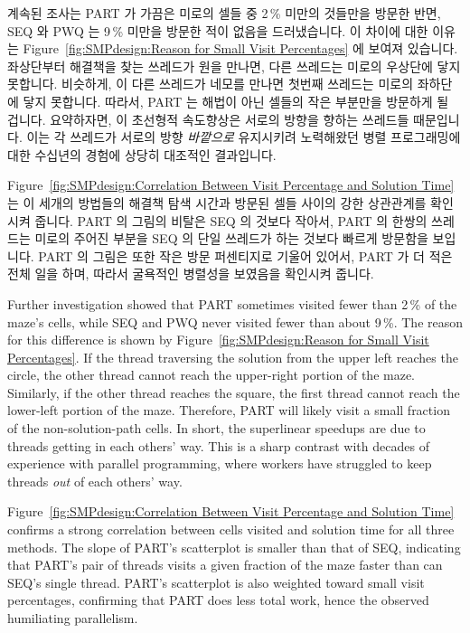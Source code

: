 계속된 조사는 PART 가 가끔은 미로의 셀들 중 2\,\% 미만의 것들만을 방문한 반면,
SEQ 와 PWQ 는 9\,\% 미만을 방문한 적이 없음을 드러냈습니다.
이 차이에 대한 이유는
Figure~\ref{fig:SMPdesign:Reason for Small Visit Percentages}
에 보여져 있습니다.
좌상단부터 해결책을 찾는 쓰레드가 원을 만나면, 다른 쓰레드는 미로의 우상단에
닿지 못합니다.
비슷하게, 이 다른 쓰레드가 네모를 만나면 첫번째 쓰레드는 미로의 좌하단에 닿지
못합니다.
따라서, PART 는 해법이 아닌 셀들의 작은 부분만을 방문하게 될 겁니다.
요약하자면, 이 초선형적 속도향상은 서로의 방향을 향하는 쓰레드들 때문입니다.
이는 각 쓰레드가 서로의 방향 \emph{바깥으로} 유지시키려 노력해왔던 병렬
프로그래밍에 대한 수십년의 경험에 상당히 대조적인 결과입니다.

Figure~\ref{fig:SMPdesign:Correlation Between Visit Percentage and Solution Time}
는 이 세개의 방법들의 해결책 탐색 시간과 방문된 셀들 사이의 강한 상관관계를
확인시켜 줍니다.
PART 의 그림의 비탈은 SEQ 의 것보다 작아서, PART 의 한쌍의 쓰레드는 미로의
주어진 부분을 SEQ 의 단일 쓰레드가 하는 것보다 빠르게 방문함을 보입니다.
PART 의 그림은 또한 작은 방문 퍼센티지로 기울어 있어서, PART 가 더 적은 전체
일을 하며, 따라서 굴욕적인 병렬성을 보였음을 확인시켜 줍니다.

\iffalse

Further investigation showed that
PART sometimes visited fewer than 2\,\% of the maze's cells,
while SEQ and PWQ never visited fewer than about 9\,\%.
The reason for this difference is shown by
Figure~\ref{fig:SMPdesign:Reason for Small Visit Percentages}.
If the thread traversing the solution from the upper left reaches
the circle, the other thread cannot reach
the upper-right portion of the maze.
Similarly, if the other thread reaches the square,
the first thread cannot reach the lower-left
portion of the maze.
Therefore, PART will likely visit a small fraction
of the non-solution-path cells.
In short, the superlinear speedups are due to threads getting in each
others' way.
This is a sharp contrast with decades of experience with
parallel programming, where workers have struggled
to keep threads \emph{out} of each others' way.

Figure~\ref{fig:SMPdesign:Correlation Between Visit Percentage and Solution Time}
confirms a strong correlation between cells visited and solution time
for all three methods.
The slope of PART's scatterplot is smaller than that of SEQ,
indicating that PART's pair of threads visits a given fraction
of the maze faster than can SEQ's single thread.
PART's scatterplot is also weighted toward small visit
percentages, confirming that PART does less total work, hence
the observed humiliating parallelism.

